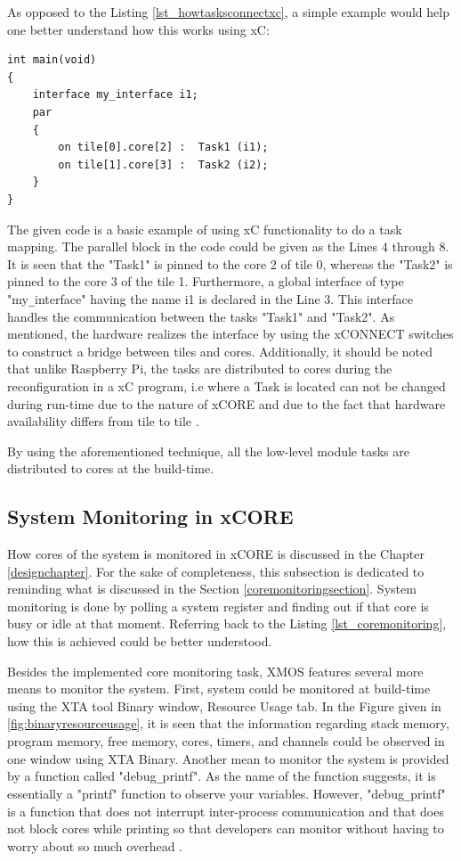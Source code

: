 As opposed to the Listing \ref{lst_howtasksconnectxc}, a simple example would help one better understand how this works using xC:

\begin{lstlisting}[style=xc]
int main(void)
{
	interface my_interface i1;
	par
	{
		on tile[0].core[2] :  Task1 (i1);
		on tile[1].core[3] :  Task2 (i2);
	}
}
\end{lstlisting}

The given code is a basic example of using xC functionality to do a task mapping. The parallel block in the code could be given as the Lines 4 through 8. It is seen that the "Task1" is pinned to the core 2 of tile 0, whereas the "Task2" is pinned to the core 3 of the tile 1. Furthermore, a global interface of type "my\texttt{\_}interface" having the name i1 is declared in the Line 3. This interface handles the communication between the tasks "Task1" and "Task2". As mentioned, the hardware realizes the interface by using the xCONNECT switches to construct a bridge between tiles and cores. Additionally, it should be noted that unlike Raspberry Pi, the tasks are distributed to cores during the reconfiguration in a xC program, i.e where a Task is located can not be changed during run-time due to the nature of xCORE and due to the fact that hardware availability differs from tile to tile \cite{xmosprogrguide}.

By using the aforementioned technique, all the low-level module tasks are distributed to cores at the build-time. 

\subsection{System Monitoring in xCORE}
How cores of the system is monitored in xCORE is discussed in the Chapter \ref{designchapter}. For the sake of completeness, this subsection is dedicated to reminding what is discussed in the Section \ref{coremonitoringsection}. System monitoring is done by polling a system register and finding out if that core is busy or idle at that moment. Referring back to the Listing  \ref{lst_coremonitoring}, how this is achieved could be better understood.

Besides the implemented core monitoring task, XMOS features several more means to monitor the system. First, system could be monitored at build-time using the XTA tool Binary window, Resource Usage tab. In the Figure given in \ref{fig:binaryresourceusage}, it is seen that the information regarding stack memory, program memory, free memory, cores, timers, and channels could be observed in one window using XTA Binary. Another mean to monitor the system is provided by a function called "debug\texttt{\_}printf". As the name of the function suggests, it is essentially a "printf" function to observe your variables. However, "debug\texttt{\_}printf" is a function that does not interrupt inter-process communication and that does not block cores while printing so that developers can monitor without having to worry about so much overhead \cite{xmosprogrguide}.

